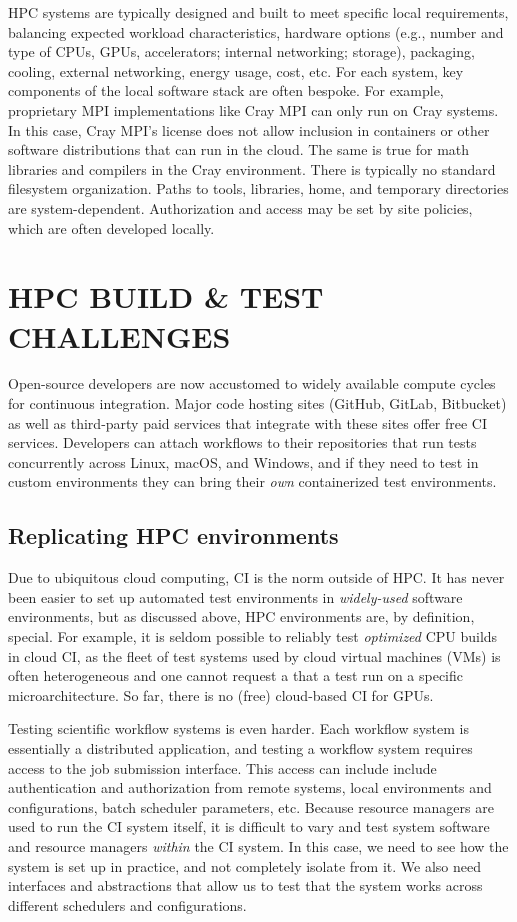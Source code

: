 \documentclass{IEEEcsmag}
\begin{document}
HPC systems are typically designed and built to meet specific local requirements, balancing
expected workload characteristics, hardware options (e.g., number and type of CPUs, GPUs,
accelerators; internal networking; storage), packaging, cooling, external networking,
energy usage, cost, etc.
For each system, key components of the local software stack are often bespoke.
For example, proprietary MPI implementations like Cray MPI can only run
on Cray systems. In this case, Cray MPI's license does not allow inclusion in
containers or other software distributions that can run in the cloud. The same is true
for math libraries and compilers in the Cray environment. There is typically no
standard filesystem organization.  Paths to tools, libraries, home, and
temporary directories are system-dependent.
Authorization and access may be set by site policies, which are often developed locally.



\section{HPC BUILD \& TEST CHALLENGES}

Open-source developers are now accustomed to widely available compute cycles for
continuous integration. Major code hosting sites
(GitHub, GitLab, Bitbucket) as well as third-party paid services that integrate with
these sites offer free CI services. Developers can attach workflows to their repositories that run tests
concurrently across Linux, macOS, and Windows, and if they need to test in
custom environments they can bring their {\it own} containerized test environments.

\subsection{Replicating HPC environments}

Due to ubiquitous cloud computing, CI is the norm outside of HPC. It has never been
easier to set up automated test environments in {\it widely-used} software environments,
but as discussed above, HPC environments are, by definition, special.
For example, it is seldom possible to reliably test {\it optimized} CPU builds in
cloud CI, as the fleet of test systems used by cloud virtual machines (VMs) is often heterogeneous and one
cannot request a that a test run on a specific microarchitecture. So far, there is no (free) cloud-based
CI for GPUs.

Testing scientific workflow systems is even harder. Each workflow system is essentially
a distributed application, and testing a workflow system requires access to the job
submission interface. This access can include include authentication and authorization from
remote systems, local environments and configurations, batch scheduler parameters, etc.
Because resource managers are used to run the CI system itself, it is
difficult to vary and test system software and resource managers {\it within} the CI system. In
this case, we need to see how the system is set up in practice, and not completely
isolate from it. We also need interfaces and abstractions that allow us to test
that the system works across different schedulers and configurations.
\end{document}
